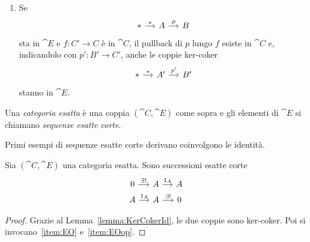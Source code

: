 \begin{definition}
\begin{enumerate}[leftmargin=*, label=(E\arabic*),
    ref=Definizione~\ref{definition:CategorieEsatte}-E\arabic*]
\[\begin{tikzcd}[column sep=small]
        A \ar["{i}", r] & B \ar["{\ast}", r] & \ast
      \end{tikzcd}
    \]
    sta in \(\cat E\) e \(f : A \to A'\) è in \(\cat C\), il pushout di
    \(i\) lungo \(f\) esiste in \(\cat C\) e, indicandolo con
    \(i' : A' \to B'\), anche le coppie ker-coker
    \[
      \begin{tikzcd}[column sep=small]
        A' \ar["{i'}", r] & B' \ar["{\ast}", r] & \ast
      \end{tikzcd}
    \]
    stanno in \(\cat E\).
  \item \label{item:E2op} Se
    \[
      \begin{tikzcd}[column sep=small]
        \ast \ar["{\ast}", r] & A \ar["{p}", r] & B
      \end{tikzcd}
    \]
    sta in \(\cat E\) e \(f : C' \to C\) è in \(\cat C\), il pullback di
    \(p\) lungo \(f\) esiste in \(\cat C\) e, indicandolo con
    \(p' : B' \to C'\), anche le coppie ker-coker
    \[
      \begin{tikzcd}[column sep=small]
        \ast \ar["{\ast}", r] & A' \ar["{p'}", r] & B'
      \end{tikzcd}
    \]
    stanno in \(\cat E\).
  \end{enumerate}
  Una {\em categoria esatta} è una coppia \((\cat C,\cat E)\) come sopra
  e gli elementi di \(\cat E\) si chiamano {\em sequenze esatte corte}.
\end{definition}

Primi esempi di sequenze esatte corte derivano coinvolgono le identità.

\begin{proposition}\label{proposition:ExactId}
  Sia \((\cat C,\cat E)\) una categoria esatta. Sono successioni esatte
  corte
  \[
    \begin{tikzcd}[row sep=tiny, column sep=small]
      0 \ar["{\exists!}", r] & A \ar["{\id_A}", r] & A \\
      A \ar["{\id_A}", r] & A \ar["{\exists!}", r] & 0
    \end{tikzcd}
  \]
\end{proposition}


\begin{proof}
  Grazie al Lemma~\ref{lemma:KerCokerId}, le due coppie sono
  ker-coker. Poi si invocano~\ref{item:EO} e~\ref{item:EOop}.
\end{proof}

